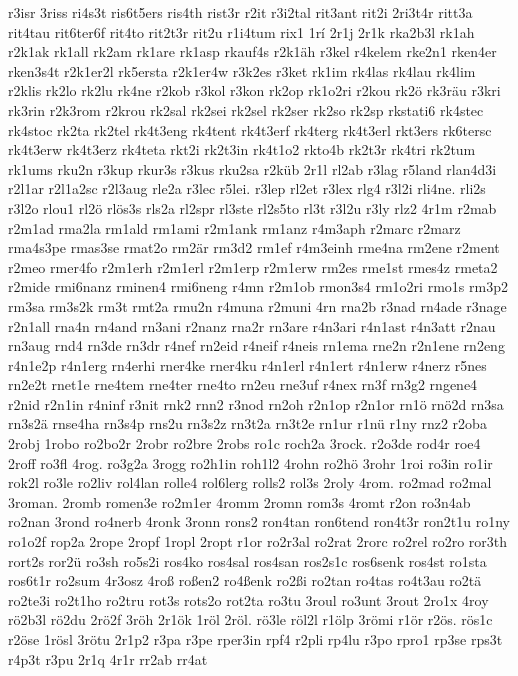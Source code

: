 {r3isr
3riss
ri4s3t
ris6t5ers
ris4th
rist3r
r2it
r3i2tal
rit3ant
rit2i
2ri3t4r
ritt3a
rit4tau
rit6ter6f
rit4to
rit2t3r
rit2u
r1i4tum
rix1
1rí
2r1j
2r1k
rka2b3l
rk1ah
r2k1ak
rk1all
rk2am
rk1are
rk1asp
rkauf4s
r2k1äh
r3kel
r4kelem
rke2n1
rken4er
rken3s4t
r2k1er2l
rk5ersta
r2k1er4w
r3k2es
r3ket
rk1im
rk4las
rk4lau
rk4lim
r2klis
rk2lo
rk2lu
rk4ne
r2kob
r3kol
r3kon
rk2op
rk1o2ri
r2kou
rk2ö
rk3räu
r3kri
rk3rin
r2k3rom
r2krou
rk2sal
rk2sei
rk2sel
rk2ser
rk2so
rk2sp
rkstati6
rk4stec
rk4stoc
rk2ta
rk2tel
rk4t3eng
rk4tent
rk4t3erf
rk4terg
rk4t3erl
rkt3ers
rk6tersc
rk4t3erw
rk4t3erz
rk4teta
rkt2i
rk2t3in
rk4t1o2
rkto4b
rk2t3r
rk4tri
rk2tum
rk1ums
rku2n
r3kup
rkur3s
r3kus
rku2sa
r2küb
2r1l
rl2ab
r3lag
r5land
rlan4d3i
r2l1ar
r2l1a2sc
r2l3aug
rle2a
r3lec
r5lei.
r3lep
rl2et
r3lex
rlg4
r3l2i
rli4ne.
rli2s
r3l2o
rlou1
rl2ö
rlös3s
rls2a
rl2spr
rl3ste
rl2s5to
rl3t
r3l2u
r3ly
rlz2
4r1m
r2mab
r2m1ad
rma2la
rm1ald
rm1ami
r2m1ank
rm1anz
r4m3aph
r2marc
r2marz
rma4s3pe
rmas3se
rmat2o
rm2är
rm3d2
rm1ef
r4m3einh
rme4na
rm2ene
r2ment
r2meo
rmer4fo
r2m1erh
r2m1erl
r2m1erp
r2m1erw
rm2es
rme1st
rmes4z
rmeta2
r2mide
rmi6nanz
rminen4
rmi6neng
r4mn
r2m1ob
rmon3s4
rm1o2ri
rmo1s
rm3p2
rm3sa
rm3s2k
rm3t
rmt2a
rmu2n
r4muna
r2muni
4rn
rna2b
r3nad
rn4ade
r3nage
r2n1all
rna4n
rn4and
rn3ani
r2nanz
rna2r
rn3are
r4n3ari
r4n1ast
r4n3att
r2nau
rn3aug
rnd4
rn3de
rn3dr
r4nef
rn2eid
r4neif
r4neis
rn1ema
rne2n
r2n1ene
rn2eng
r4n1e2p
r4n1erg
rn4erhi
rner4ke
rner4ku
r4n1erl
r4n1ert
r4n1erw
r4nerz
r5nes
rn2e2t
rnet1e
rne4tem
rne4ter
rne4to
rn2eu
rne3uf
r4nex
rn3f
rn3g2
rngene4
r2nid
r2n1in
r4ninf
r3nit
rnk2
rnn2
r3nod
rn2oh
r2n1op
r2n1or
rn1ö
rnö2d
rn3sa
rn3s2ä
rnse4ha
rn3s4p
rns2u
rn3s2z
rn3t2a
rn3t2e
rn1ur
r1nü
r1ny
rnz2
r2oba
2robj
1robo
ro2bo2r
2robr
ro2bre
2robs
ro1c
roch2a
3rock.
r2o3de
rod4r
roe4
2roff
ro3fl
4rog.
ro3g2a
3rogg
ro2h1in
roh1l2
4rohn
ro2hö
3rohr
1roi
ro3in
ro1ir
rok2l
ro3le
ro2liv
rol4lan
rolle4
rol6lerg
rolls2
rol3s
2roly
4rom.
ro2mad
ro2mal
3roman.
2romb
romen3e
ro2m1er
4romm
2romn
rom3s
4romt
r2on
ro3n4ab
ro2nan
3rond
ro4nerb
4ronk
3ronn
rons2
ron4tan
ron6tend
ron4t3r
ron2t1u
ro1ny
ro1o2f
rop2a
2rope
2ropf
1ropl
2ropt
r1or
ro2r3al
ro2rat
2rorc
ro2rel
ro2ro
ror3th
rort2s
ror2ü
ro3sh
ro5s2i
ros4ko
ros4sal
ros4san
ros2s1c
ros6senk
ros4st
ro1sta
ros6t1r
ro2sum
4r3osz
4roß
roßen2
ro4ßenk
ro2ßi
ro2tan
ro4tas
ro4t3au
ro2tä
ro2te3i
ro2t1ho
ro2tru
rot3s
rots2o
rot2ta
ro3tu
3roul
ro3unt
3rout
2ro1x
4roy
rö2b3l
rö2du
2rö2f
3röh
2r1ök
1röl
2röl.
rö3le
röl2l
r1ölp
3römi
r1ör
r2ös.
rös1c
r2öse
1rösl
3rötu
2r1p2
r3pa
r3pe
rper3in
rpf4
r2pli
rp4lu
r3po
rpro1
rp3se
rps3t
r4p3t
r3pu
2r1q
4r1r
rr2ab
rr4at
}

